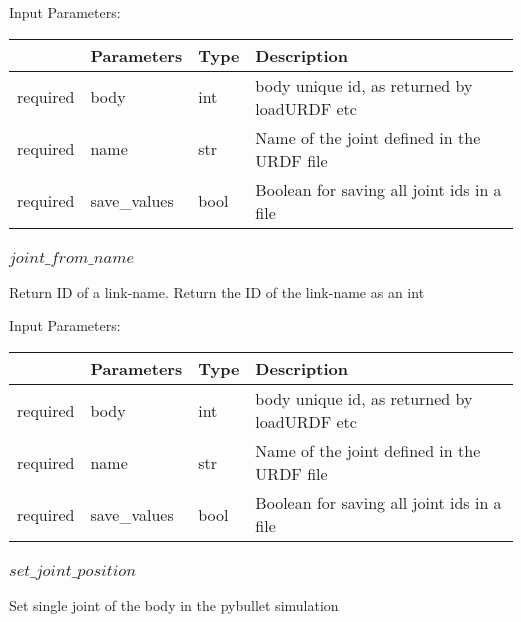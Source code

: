 \documentclass[
	ngerman,
	accentcolor=9c,%
	type=intern,
	marginpar=false
	]{tudapub}
\begin{document}
\vspace{0.5cm}
\noindent Input Parameters:
\vspace{0.5cm}

\begin{tabular}{|p{}|p{}|p{}| p{}|}
\hline
 & \textbf{Parameters} & \textbf{Type} & \textbf{Description} \\
\hline
required & body & int & body unique id, as returned by loadURDF etc\\
\hline
required & name & str & Name of the joint defined in the URDF file\\
\hline
required & save\_values & bool & Boolean for saving all joint ids in a file\\
\hline

\end{tabular}
\vspace{0.5cm}



\subsubsection{$joint\_from\_name$}
\noindent Return ID of a link-name. Return the ID of the link-name as an int

\vspace{0.5cm}
\noindent Input Parameters:
\vspace{0.5cm}

\begin{tabular}{|p{}|p{}|p{}| p{}|}
\hline
 & \textbf{Parameters} & \textbf{Type} & \textbf{Description} \\
\hline
required & body & int & body unique id, as returned by loadURDF etc\\
\hline
required & name & str & Name of the joint defined in the URDF file\\
\hline
required & save\_values & bool & Boolean for saving all joint ids in a file\\
\hline

\end{tabular}
\vspace{0.5cm}








\subsubsection{$set\_joint\_position$}
\noindent Set single joint of the body in the pybullet simulation
\end{document}
